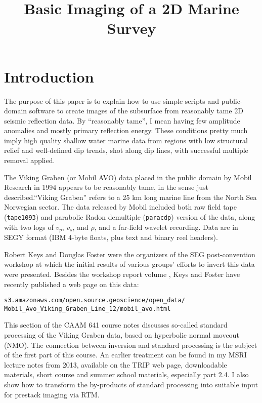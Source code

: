 \title{Basic Imaging of a 2D Marine Survey}
\maketitle
\label{ch:basic}

\section{Introduction}
The purpose of this paper is to explain how to use simple scripts and public-domain software to create images of the subsurface from reasonably tame 2D seismic reflection data. By ``reasonably tame'', I mean having few amplitude anomalies and mostly primary reflection energy. These conditions pretty much imply high quality shallow water marine data from regions with low structural relief and well-defined dip trends, shot along dip lines, with successful multiple removal applied.

The Viking Graben (or Mobil AVO) data placed in the public domain by Mobil Research in 1994 appears to be reasonably tame, in the sense just described.``Viking Graben'' refers to a 25 km long marine line from the North Sea Norwegian sector. The data released by Mobil included both raw field tape ({\tt tape1093}) and parabolic Radon demultiple ({\tt paracdp}) version of the data, along with two logs of $v_p$, $v_s$, and $\rho$, and a far-field wavelet recording. Data are in SEGY format (IBM 4-byte floats, plus text and binary reel headers).

Robert Keys and Douglas Foster were the organizers of the SEG post-convention workshop at which the initial results of various groups' efforts to invert this data were presented. Besides the workshop report volume \cite[]{FosterKeys:98}, Keys and Foster have recently published a web page on this data:
\begin{verbatim}
s3.amazonaws.com/open.source.geoscience/open_data/
Mobil_Avo_Viking_Graben_Line_12/mobil_avo.html
\end{verbatim}

This section of the CAAM 641 course notes discusses so-called standard processing of the Viking Graben data, based on hyperbolic normal moveout (NMO). The connection between inversion and standard processing is the subject of the first part of this course. An earlier treatment can be found in my MSRI lecture notes from 2013, available on the TRIP web page, downloadable materials, short course and summer school materials, especially part 2.4. I also show how to transform the by-products of standard processing into suitable input for prestack imaging via RTM.

